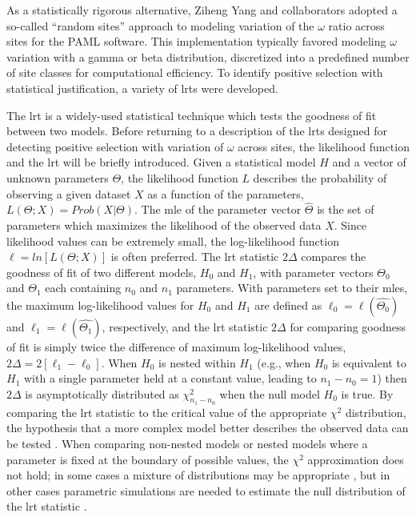 As a statistically rigorous alternative, Ziheng Yang and collaborators
adopted a so-called ``random sites'' approach to modeling variation of
the $\omega$ ratio across sites for the PAML software. This
implementation typically favored modeling $\omega$ variation with a
gamma or beta distribution, discretized into a predefined number of
site classes for computational efficiency. To identify positive
selection with statistical justification, a variety of \acp{lrt} were
developed.

The \ac{lrt} is a widely-used statistical technique which tests the
goodness of fit between two models. Before returning to a description
of the \acp{lrt} designed for detecting positive selection with
variation of $\omega$ across sites, the likelihood function and the
\ac{lrt} will be briefly introduced. Given a statistical model $H$ and
a vector of unknown parameters $\Theta$, the likelihood function $L$
describes the probability of observing a given dataset $X$ as a
function of the parameters, $L(\Theta;X)=Prob(X|\Theta)$. The \ac{mle}
of the parameter vector $\hat{\Theta}$ is the set of parameters which
maximizes the likelihood of the observed data $X$. Since likelihood
values can be extremely small, the log-likelihood function
$\ell=ln[L(\Theta;X)]$ is often preferred. The \ac{lrt} statistic
$2\Delta$ compares the goodness of fit of two different models,
$H_{0}$ and $H_{1}$, with parameter vectors $\Theta_{0}$ and
$\Theta_{1}$ each containing $n_{0}$ and $n_{1}$ parameters. With
parameters set to their \acp{mle}, the maximum log-likelihood values
for $H_{0}$ and $H_{1}$ are defined as
$\ell_{0}=\ell(\hat{\Theta_{0}})$ and
$\ell_{1}=\ell(\hat{\Theta_{1}})$, respectively, and the \ac{lrt}
statistic $2\Delta$ for comparing goodness of fit is simply twice the
difference of maximum log-likelihood values, $2\Delta = 2[\ell_{1} -
  \ell_{0}]$. When $H_{0}$ is nested within $H_{1}$ (e.g., when
$H_{0}$ is equivalent to $H_{1}$ with a single parameter held at a
constant value, leading to $n_{1}-n_{0}=1$) then $2\Delta$ is asymptotically distributed as
$\chi^{2}_{n_{1}-n_{0}}$ when the null model $H_{0}$ is true. By
comparing the \ac{lrt} statistic to the critical value of the
appropriate $\chi^2$ distribution, the hypothesis that a more complex
model better describes the observed data can be tested
\citep{Wilks1938,Yang2006}. When comparing non-nested models or nested
models where a parameter is fixed at the boundary of possible values,
the $\chi^2$ approximation does not hold; in some cases a mixture of
distributions may be appropriate \citep{Whelan1999}, but in other
cases parametric simulations are needed to estimate the null
distribution of the \ac{lrt} statistic \citep{Goldman1993a}.

